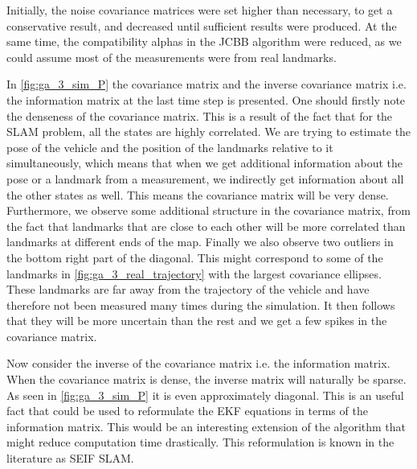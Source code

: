 Initially, the noise covariance matrices were set higher than necessary, to get a conservative result, and decreased until sufficient results were produced. At the same time, the compatibility alphas in the JCBB algorithm were reduced, as we could assume most of the measurements were from real landmarks.



In \cref{fig:ga_3_sim_P} the covariance matrix and the inverse covariance matrix i.e. the information matrix at the last time step is presented. One should firstly note the denseness of the covariance matrix. This is a result of the fact that for the SLAM problem, all the states are highly correlated. We are trying to estimate the pose of the vehicle and the position of the landmarks relative to it simultaneously, which means that when we get additional information about the pose or a landmark from a measurement, we indirectly get information about all the other states as well. This means the covariance matrix will be very dense. Furthermore, we observe some additional structure in the covariance matrix, from the fact that landmarks that are close to each other will be more correlated than landmarks at different ends of the map. Finally we also observe two outliers in the bottom right part of the diagonal. This might correspond to some of the landmarks in \cref{fig:ga_3_real_trajectory} with the largest covariance ellipses. These landmarks are far away from the trajectory of the vehicle and have therefore not been measured many times during the simulation. It then follows that they will be more uncertain than the rest and we get a few spikes in the covariance matrix.

Now consider the inverse of the covariance matrix i.e. the information matrix. When the covariance matrix is dense, the inverse matrix will naturally be sparse. As seen in \cref{fig:ga_3_sim_P} it is even approximately diagonal. This is an useful fact that could be used to reformulate the EKF equations in terms of the information matrix. This would be an interesting extension of the algorithm that might reduce computation time drastically. This reformulation is known in the literature as SEIF SLAM.   

